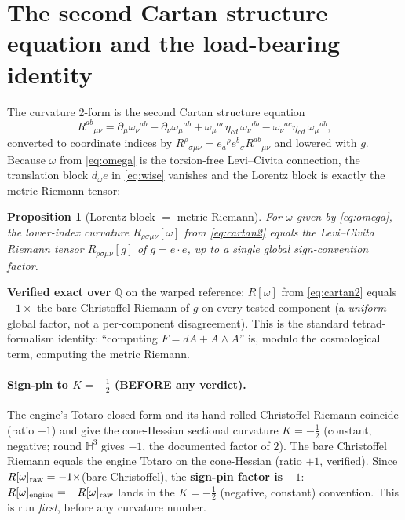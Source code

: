 \documentclass[11pt]{article}
\newcommand{\Q}{\mathbb{Q}}
\newcommand{\eu}{e}
\newcommand{\om}{\omega}
\theoremstyle{definition}\newtheorem{remark}{Remark}
\theoremstyle{plain}\newtheorem{proposition}{Proposition}
\begin{document}
\section{The second Cartan structure equation and the load-bearing identity}
The curvature 2-form is the second Cartan structure equation
\begin{equation}\label{eq:cartan2}
  R^{ab}{}_{\mu\nu}=\partial_\mu \om_\nu{}^{ab}-\partial_\nu \om_\mu{}^{ab}
  +\om_\mu{}^{ac}\eta_{cd}\,\om_\nu{}^{db}-\om_\nu{}^{ac}\eta_{cd}\,\om_\mu{}^{db},
\end{equation}
converted to coordinate indices by $R^\rho{}_{\sigma\mu\nu}=\eu_a{}^\rho \eu^b{}_\sigma R^{ab}{}_{\mu\nu}$
and lowered with $g$. Because $\om$ from \eqref{eq:omega} is the torsion-free Levi--Civita connection,
the translation block $d_\om \eu$ in \eqref{eq:wise} vanishes and the Lorentz block is exactly the
metric Riemann tensor:
\begin{proposition}[Lorentz block $=$ metric Riemann]\label{prop:identity}
For $\om$ given by \eqref{eq:omega}, the lower-index curvature $R_{\rho\sigma\mu\nu}[\om]$ from
\eqref{eq:cartan2} equals the Levi--Civita Riemann tensor $R_{\rho\sigma\mu\nu}[g]$ of $g=\eu\cdot\eu$,
up to a single global sign-convention factor.
\end{proposition}
\textbf{Verified exact over $\Q$} on the warped reference: $R[\om]$ from \eqref{eq:cartan2}
equals $-1\times$ the bare Christoffel Riemann of $g$ on every tested component (a \emph{uniform}
global factor, not a per-component disagreement). This is the standard tetrad-formalism identity:
``computing $F=dA+A\wedge A$'' is, modulo the cosmological term, computing the metric Riemann.

\paragraph{Sign-pin to $K=-\tfrac12$ (BEFORE any verdict).}
The engine's Totaro closed form and its hand-rolled Christoffel Riemann coincide
(ratio $+1$) and give the cone-Hessian sectional curvature $K=-\tfrac12$ (constant, negative;
round $\mathbb{H}^3$ gives $-1$, the documented factor of $2$). The bare Christoffel Riemann equals
the engine Totaro on the cone-Hessian (ratio $+1$, verified). Since $R[\om]_{\rm raw}=-1\times$(bare
Christoffel), the \textbf{sign-pin factor is $-1$}: $R[\om]_{\rm engine}=-R[\om]_{\rm raw}$ lands in the
$K=-\tfrac12$ (negative, constant) convention. This is run \emph{first}, before any curvature number.
\end{document}
